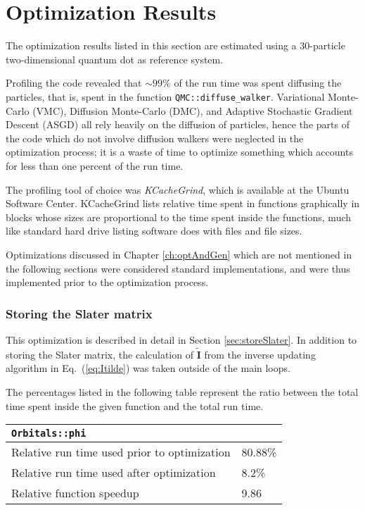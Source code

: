 \section{Optimization Results}
\label{sec:optRes}

The optimization results listed in this section are estimated using a 30-particle two-dimensional quantum dot as reference system.

Profiling the code revealed that $\sim99\%$ of the run time was spent diffusing the particles, that is, spent in the function \verb+QMC::diffuse_walker+. Variational Monte-Carlo (VMC), Diffusion Monte-Carlo (DMC), and Adaptive Stochastic Gradient Descent (ASGD) all rely heavily on the diffusion of particles, hence the parts of the code which do not involve diffusion walkers were neglected in the optimization process; it is a waste of time to optimize something which accounts for less than one percent of the run time.  

The profiling tool of choice was \textit{KCacheGrind}, which is available at the Ubuntu Software Center. KCacheGrind lists relative time spent in functions graphically in blocks whose sizes are proportional to the time spent inside the functions, much like standard hard drive listing software does with files and file sizes.

Optimizations discussed in Chapter \ref{ch:optAndGen} which are not mentioned in the following sections were considered standard implementations, and were thus implemented prior to the optimization process.

\subsubsection{Storing the Slater matrix}

This optimization is described in detail in Section \ref{sec:storeSlater}. In addition to storing the Slater matrix, the calculation of $\mathbf{\tilde I}$ from the inverse updating algorithm in Eq.~(\ref{eq:Itilde}) was taken outside of the main loops.

The percentages listed in the following table represent the ratio between the total time spent inside the given function and the total run time. 

\begin{tabular}{ll}
 \verb+Orbitals::phi+ & \\
 \hline\hline
 Relative run time used prior to optimization & 80.88\% \\
 Relative run time used after optimization    & 8.2\% \\
 \hline
 Relative function speedup                   & 9.86
\end{tabular}

